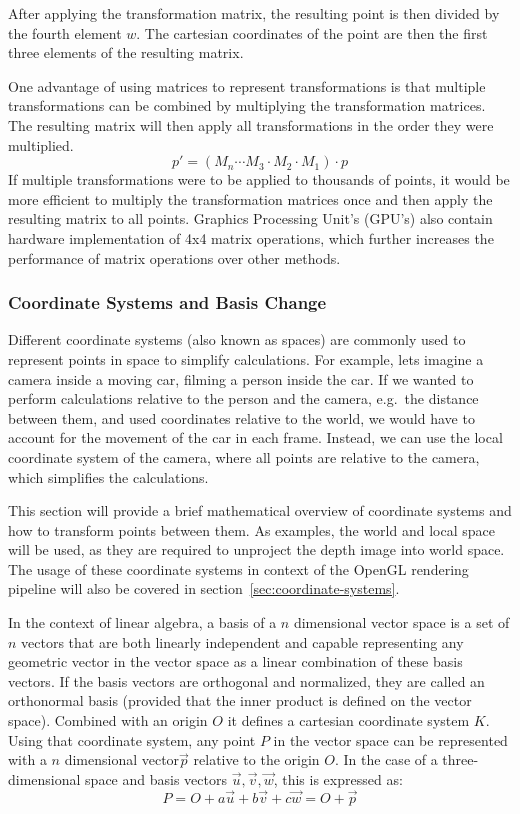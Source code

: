 After applying the transformation matrix, the resulting point is then divided by the fourth element $w$.
The cartesian coordinates of the point are then the first three elements of the resulting matrix.

One advantage of using matrices to represent transformations is that multiple transformations can be combined by
multiplying the transformation matrices.
The resulting matrix will then apply all transformations in the order they were multiplied.
\begin{equation}
    p' = (M_n \cdots M_3 \cdot M_2 \cdot M_1) \cdot p
\end{equation}
If multiple transformations were to be applied to thousands of points,
it would be more efficient to multiply the transformation matrices once and then apply the resulting matrix to all points.
Graphics Processing Unit's (GPU's) also contain hardware implementation of 4x4 matrix operations,
which further increases the performance of matrix operations over other methods.

\cite{dorner_virtual_2019}
\subsubsection{Coordinate Systems and Basis Change}

Different coordinate systems (also known as spaces) are commonly used to represent points in space to simplify calculations.
For example, lets imagine a camera inside a moving car, filming a person inside the car.
If we wanted to perform calculations relative to the person and the camera, e.g.\ the distance between them,
and used coordinates relative to the world, we would have to account for the movement of the car in each frame.
Instead, we can use the local coordinate system of the camera,
where all points are relative to the camera, which simplifies the calculations.

This section will provide a brief mathematical overview of coordinate systems and how to transform points between them.
As examples, the world and local space will be used, as they are required to unproject the depth image into world space.
The usage of these coordinate systems in context of the OpenGL rendering pipeline will also be covered in section~\ref{sec:coordinate-systems}.

In the context of linear algebra,
a basis of a $n$ dimensional vector space is a set of $n$ vectors that are both linearly independent
and capable representing any geometric vector in the vector space as a linear combination of these basis vectors.
If the basis vectors are orthogonal and normalized,
they are called an orthonormal basis (provided that the inner product is defined on the vector space).
Combined with an origin $O$ it defines a cartesian coordinate system $K$.
Using that coordinate system, any point $P$ in the vector space can be represented with a $n$ dimensional
vector$\vec{p}$ relative to the origin $O$.
In the case of a three-dimensional space and basis vectors $\vec{u}, \vec{v}, \vec{w}$, this is expressed as:
\begin{equation}
    P = O + a\vec{u} + b\vec{v} + c\vec{w} = O + \vec{p}
\end{equation}

